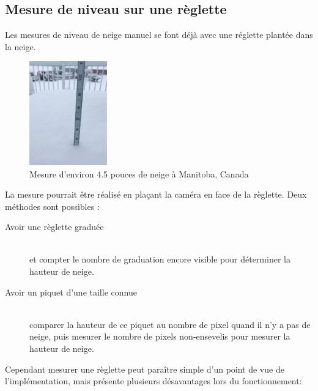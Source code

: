 \newpage

\subsection{Mesure de niveau sur une règlette}
Les mesures de niveau de neige manuel se font déjà avec une réglette plantée dans la neige.

\begin{figure}[H]
    \centering
    \includegraphics[width=0.3\textwidth]{Images/computer_vision/snow_meter.PNG}
    \caption[Mesure de neige à la règle]{Mesure d'environ 4.5 pouces de neige à Manitoba, Canada\footnotemark[1]}
    \label{fig:Snow meter}
\end{figure}
\noindent
La mesure pourrait être réalisé en plaçant la caméra en face de la règlette.
Deux méthodes sont possibles :
\begin{description}
    \item[Avoir une règlette graduée] \hfill \\
    et compter le nombre de graduation encore visible pour déterminer la hauteur de neige.
    \item[Avoir un piquet d'une taille connue] \hfill \\
    comparer la hauteur de ce piquet au nombre de pixel quand il n'y a pas de neige,
    puis mesurer le nombre de pixels non-ensevelis pour mesurer la hauteur de neige.
\end{description}
\noindent
Cependant mesurer une règlette peut paraître simple d'un point de vue de l'implémentation,
mais présente plusieurs désavantages lors du fonctionnement:


